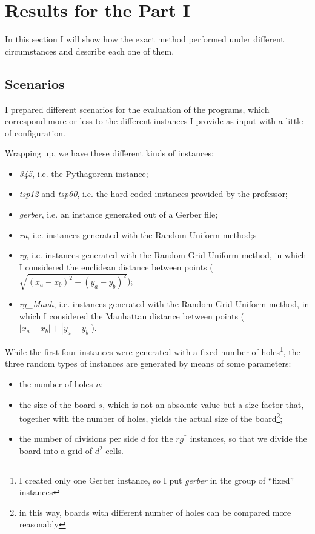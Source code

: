 \section{Results for the Part I}

In this section I will show how the exact method performed under different
circumstances and describe each one of them.

\subsection{Scenarios}

I prepared different scenarios for the evaluation of the programs, which
correspond more or less to the different instances I provide as input with a
little of configuration.

Wrapping up, we have these different kinds of instances:

\begin{itemize}
  \item \textit{345}, i.e. the Pythagorean instance;
  \item \textit{tsp12} and \textit{tsp60}, i.e. the hard-coded instances
    provided by the professor;
  \item \textit{gerber}, i.e. an instance generated out of a Gerber file;
  \item \textit{ru}, i.e. instances generated with the Random Uniform method;s
  \item \textit{rg}, i.e. instances generated with the Random Grid Uniform
    method, in which I considered the euclidean distance between points
    ($\sqrt{(x_a - x_b)^2 + (y_a - y_b)^2}$);
  \item \textit{rg\_Manh}, i.e. instances generated with the Random Grid Uniform
    method, in which I considered the Manhattan distance between points
    ($|x_a - x_b| + |y_a - y_b|$).
\end{itemize}

While the first four instances were generated with a fixed number of
holes\footnote{I created only one Gerber instance, so I put \textit{gerber} in
the group of ``fixed'' instances}, the three random types of instances are
generated by means of some parameters:

\begin{itemize}
  \item the number of holes $n$;
  \item the size of the board $s$, which is not an absolute value but a size
    factor that, together with the number of holes, yields the actual size of
    the board\footnote{in this way, boards with different number of holes can
    be compared more reasonably};
  \item the number of divisions per side $d$ for the $rg^*$ instances, so that
    we divide the board into a grid of $d^2$ cells.
\end{itemize}

